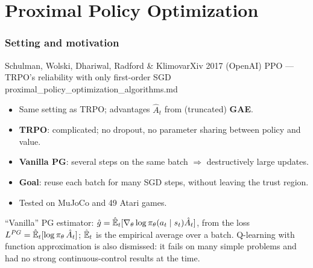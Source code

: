 \clearpage
\part{Proximal Policy Optimization}


\section{Setting and motivation}

  {Schulman, Wolski, Dhariwal, Radford \& Klimov}{arXiv 2017 (OpenAI)}
  {PPO --- TRPO's reliability with only first-order SGD}
  {proximal\_policy\_optimization\_algorithms.md}

\begin{itemize}
  \item Same setting as TRPO; advantages $\hat A_t$ from (truncated) \textbf{GAE}.
  \item \textbf{TRPO}: complicated; no dropout, no parameter sharing between policy and value.
  \item \textbf{Vanilla PG}: several steps on the same batch $\Rightarrow$ destructively large updates.
  \item \textbf{Goal}: reuse each batch for many SGD steps, without leaving the trust region.
  \item Tested on MuJoCo and 49 Atari games.
\end{itemize}

\begin{notebox}
``Vanilla'' PG estimator: $\hat g=\hat{\mathbb{E}}_t[\nabla_\theta\log\pi_\theta(a_t\mid s_t)\hat A_t]$, from the loss $L^{PG}=\hat{\mathbb{E}}_t[\log\pi_\theta\,\hat A_t]$; $\hat{\mathbb{E}}_t$ is the empirical average over a batch. Q-learning with function approximation is also dismissed: it fails on many simple problems and had no strong continuous-control results at the time.
\end{notebox}

